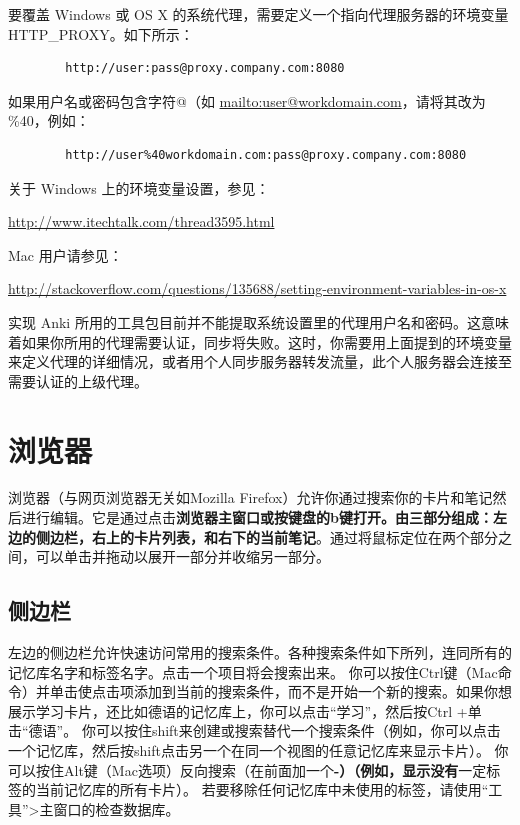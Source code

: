 \documentclass[a4paper]{book}
\begin{document}
	要覆盖 Windows 或 OS X 的系统代理，需要定义一个指向代理服务器的环境变量 HTTP\_PROXY。如下所示：
	
	\begin{shaded}\begin{verbatim}
		http://user:pass@proxy.company.com:8080
		\end{verbatim}\end{shaded}
	
	如果用户名或密码包含字符@（如 \url{mailto:user@workdomain.com}，请将其改为 \%40，例如：
	
	\begin{shaded}\begin{verbatim}
		http://user%40workdomain.com:pass@proxy.company.com:8080
		\end{verbatim}\end{shaded}
	关于 Windows 上的环境变量设置，参见：
	
	\url{http://www.itechtalk.com/thread3595.html}
	
	Mac 用户请参见：
	
	\url{http://stackoverflow.com/questions/135688/setting-environment-variables-in-os-x}
	
	
	\begin{shaded}
		实现 Anki 所用的工具包目前并不能提取系统设置里的代理用户名和密码。这意味着如果你所用的代理需要认证，同步将失败。这时，你需要用上面提到的环境变量来定义代理的详细情况，或者用个人同步服务器转发流量，此个人服务器会连接至需要认证的上级代理。
	\end{shaded}
	
	
	\chapter{浏览器}\label{}
	
	浏览器（与网页浏览器无关如Mozilla Firefox）允许你通过搜索你的卡片和笔记然后进行编辑。它是通过点击\textbf{浏览器主窗口或按键盘的b键打开。由三部分组成：左边的侧边栏，右上的卡片列表，和右下的当前笔记}。通过将鼠标定位在两个部分之间，可以单击并拖动以展开一部分并收缩另一部分。
	\section{侧边栏}
	左边的侧边栏允许快速访问常用的搜索条件。各种搜索条件如下所列，连同所有的记忆库名字和标签名字。点击一个项目将会搜索出来。
	你可以按住Ctrl键（Mac命令）并单击使点击项添加到当前的搜索条件，而不是开始一个新的搜索。如果你想展示学习卡片，还比如德语的记忆库上，你可以点击“学习”，然后按Ctrl +单击“德语”。
	你可以按住shift来创建或搜索替代一个搜索条件（例如，你可以点击一个记忆库，然后按shift点击另一个在同一个视图的任意记忆库来显示卡片）。
	你可以按住Alt键（Mac选项）反向搜索（在前面加一个\textbf{-）（例如，显示没有}一定标签的当前记忆库的所有卡片）。
	若要移除任何记忆库中未使用的标签，请使用“工具”>主窗口的检查数据库。
\end{document}
